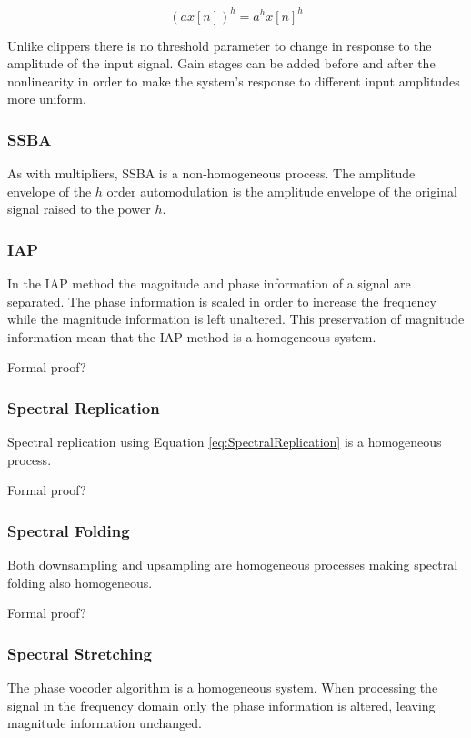 			\begin{equation}
				(ax[n])^{h} = a^{h}x[n]^{h}
				\label{eq:MultiplierHomogeneity}
			\end{equation}

			Unlike clippers there is no threshold parameter to change in response to the amplitude of the input
			signal. Gain stages can be added before and after the nonlinearity in order to make the system's
			response to different input amplitudes more uniform.

		\subsubsection*{SSBA}
			As with multipliers, SSBA is a non-homogeneous process. The amplitude envelope of the $h$
			order automodulation is the amplitude envelope of the original signal raised to the power $h$. 

		\subsubsection*{IAP}
			In the IAP method the magnitude and phase information of a signal are separated. The phase
			information is scaled in order to increase the frequency while the magnitude information is left
			unaltered. This preservation of magnitude information mean that the IAP method is a homogeneous
			system.

			\note
			{
				Formal proof?
			}

		\subsubsection*{Spectral Replication}
			Spectral replication using Equation \ref{eq:SpectralReplication} is a homogeneous process.

			\note
			{
				Formal proof?
			}
			
		\subsubsection*{Spectral Folding}
			Both downsampling and upsampling are homogeneous processes making spectral folding also
			homogeneous.

			\note
			{
				Formal proof?
			}
			
		\subsubsection*{Spectral Stretching}
			The phase vocoder algorithm is a homogeneous system. When processing the signal in the frequency
			domain only the phase information is altered, leaving magnitude information unchanged. 

